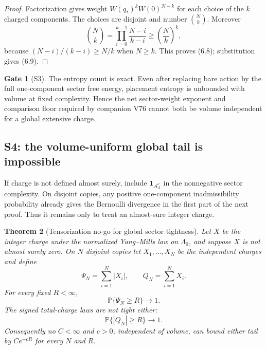 \documentclass[11pt]{article}
\newtheorem{theorem}{Theorem}[section]
\theoremstyle{definition}
\newtheorem{gate}[theorem]{Gate}
\theoremstyle{remark}
\newcommand{\cA}{\mathcal A}
\begin{document}
\begin{proof}
Factorization gives weight $W(q_*)^kW(0)^{N-k}$ for each choice of the $k$
charged components.  The choices are disjoint and number $\binom Nk$.
Moreover
\[
 \binom Nk
 =\prod_{i=0}^{k-1}\frac{N-i}{k-i}
 \ge\left(\frac Nk\right)^k,
\]
because $(N-i)/(k-i)\ge N/k$ when $N\ge k$.  This proves (6.8);
substitution gives (6.9).
\end{proof}

\begin{gate}[S3]
The entropy count is exact.  Even after replacing bare action by the full
one-component sector free energy, placement entropy is unbounded with volume
at fixed complexity.  Hence the net sector-weight exponent and comparison
floor required by companion V76 cannot both be volume independent for a
global extensive charge.
\end{gate}

\subsection{S4: the volume-uniform global tail is impossible}

If charge is not defined almost surely, include
$\mathbf 1_{\cA_\Lambda^c}$ in the nonnegative sector complexity.  On
disjoint copies, any positive one-component inadmissibility probability
already gives the Bernoulli divergence in the first part of the next proof.
Thus it remains only to treat an almost-sure integer charge.

\begin{theorem}[Tensorization no-go for global sector tightness]
\label{thm:global-sector-no-go}
Let $X$ be the integer charge under the normalized Yang--Mills law on
$\Lambda_0$, and suppose $X$ is not almost surely zero.  On $N$ disjoint
copies let $X_1,\ldots,X_N$ be the independent charges and define
\[
 \Psi_N=\sum_{i=1}^N|X_i|,
 \qquad
 Q_N=\sum_{i=1}^NX_i.                                      \tag{6.10}
\]
For every fixed $R<\infty$,
\[
 \mathbb P\{\Psi_N\ge R\}\longrightarrow1.                 \tag{6.11}
\]
The signed total-charge laws are not tight either:
\[
 \mathbb P\{|Q_N|\ge R\}\longrightarrow1.                  \tag{6.12}
\]
Consequently no $C<\infty$ and $c>0$, independent of volume, can bound
either tail by $Ce^{-cR}$ for every $N$ and $R$.
\end{theorem}
\end{document}
